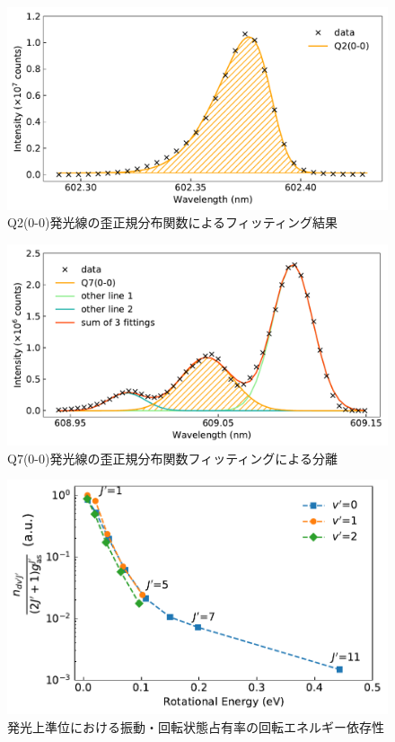 \begin{figure}
    \centering
    \includegraphics[width=15cm]{pictures/skewed-gaussian-fitting-00_Q2.pdf}
    \caption{Q2(0-0)発光線の歪正規分布関数によるフィッティング結果}
    \label{fig:voigt-fitting-1}
\end{figure}

\begin{figure}
    \centering
    \includegraphics[width=15cm]{pictures/skewed-gaussian-fitting-00_Q7.pdf}
    \caption{Q7(0-0)発光線の歪正規分布関数フィッティングによる分離}
    \label{fig:voigt-fitting-2}
\end{figure}

\begin{figure}
    \centering
    \includegraphics[width=15cm]{pictures/upper-boltzmann-plot.pdf}
    \caption{発光上準位における振動・回転状態占有率の回転エネルギー依存性}
    \label{fig:upper-boltzmann-plot}
\end{figure}

